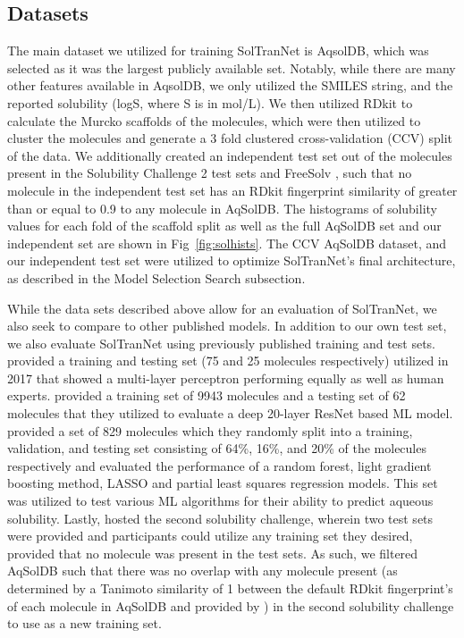 \documentclass[journal=jmcmar,manuscript=article]{achemso}
\begin{document}
\subsection{Datasets}
The main dataset we utilized for training SolTranNet is AqsolDB\cite{AqSol}, which was selected as it was the largest publicly available set.
Notably, while there are many other features available in AqsolDB, we only utilized the SMILES string, and the reported solubility (logS, where S is in mol/L).
We then utilized RDkit\cite{rdkit} to calculate the Murcko scaffolds of the molecules, which were then utilized to cluster the molecules and generate a 3 fold clustered cross-validation (CCV) split of the data.
We additionally created an independent test set out of the molecules present in the Solubility Challenge 2 test sets \cite{llinas} and FreeSolv \cite{freesolv}, such that no molecule in the independent test set has an RDkit fingerprint similarity of greater than or equal to 0.9 to any molecule in AqSolDB.
The histograms of solubility values for each fold of the scaffold split as well as the full AqSolDB set and our independent set are shown in Fig~\ref{fig:solhists}.
The CCV AqSolDB dataset, and our independent test set were utilized to optimize SolTranNet's final architecture, as described in the Model Selection Search subsection.

While the data sets described above allow for an evaluation of SolTranNet, we also seek to compare to other published models. In addition to our own test set, we also evaluate SolTranNet using previously published training and test sets.
\citet{boobier} provided a training and testing set (75 and 25 molecules respectively) utilized in 2017 that showed a multi-layer perceptron performing equally as well as human experts.
\citet{cui} provided a training set of 9943 molecules and a testing set of 62 molecules that they utilized to evaluate a deep 20-layer ResNet based ML model.
\citet{lovric} provided a set of 829 molecules which they randomly split into a training, validation, and testing set consisting of 64\%, 16\%, and 20\% of the molecules respectively and evaluated the performance of a random forest, light gradient boosting method, LASSO and partial least squares regression models.
This set was utilized to test various ML algorithms for their ability to predict aqueous solubility.
Lastly, \citet{llinas} hosted the second solubility challenge, wherein two test sets were provided and participants could utilize any training set they desired, provided that no molecule was present in the test sets.
As such, we filtered AqSolDB such that there was no overlap with any molecule present (as determined by a Tanimoto similarity of 1 between the default RDkit fingerprint's of each molecule in AqSolDB and provided by \citet{llinas}) in the second solubility challenge to use as a new training set.
\end{document}
